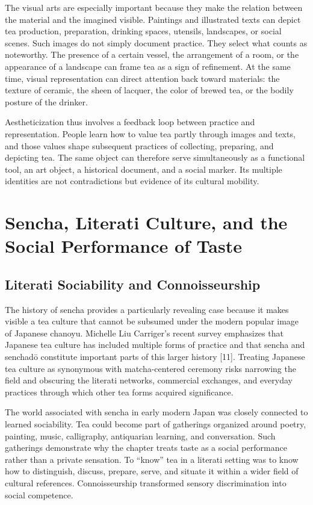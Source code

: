 \documentclass[11pt,a4paper]{article}
\begin{document}
The visual arts are especially important because they make the relation between the material and the imagined visible. Paintings and illustrated texts can depict tea production, preparation, drinking spaces, utensils, landscapes, or social scenes. Such images do not simply document practice. They select what counts as noteworthy. The presence of a certain vessel, the arrangement of a room, or the appearance of a landscape can frame tea as a sign of refinement. At the same time, visual representation can direct attention back toward materials: the texture of ceramic, the sheen of lacquer, the color of brewed tea, or the bodily posture of the drinker.

Aestheticization thus involves a feedback loop between practice and representation. People learn how to value tea partly through images and texts, and those values shape subsequent practices of collecting, preparing, and depicting tea. The same object can therefore serve simultaneously as a functional tool, an art object, a historical document, and a social marker. Its multiple identities are not contradictions but evidence of its cultural mobility.

\section{Sencha, Literati Culture, and the Social Performance of Taste}

\subsection{Literati Sociability and Connoisseurship}

The history of sencha provides a particularly revealing case because it makes visible a tea culture that cannot be subsumed under the modern popular image of Japanese chanoyu. Michelle Liu Carriger's recent survey emphasizes that Japanese tea culture has included multiple forms of practice and that sencha and senchadō constitute important parts of this larger history [11]. Treating Japanese tea culture as synonymous with matcha-centered ceremony risks narrowing the field and obscuring the literati networks, commercial exchanges, and everyday practices through which other tea forms acquired significance.

The world associated with sencha in early modern Japan was closely connected to learned sociability. Tea could become part of gatherings organized around poetry, painting, music, calligraphy, antiquarian learning, and conversation. Such gatherings demonstrate why the chapter treats taste as a social performance rather than a private sensation. To ``know'' tea in a literati setting was to know how to distinguish, discuss, prepare, serve, and situate it within a wider field of cultural references. Connoisseurship transformed sensory discrimination into social competence.
\end{document}

